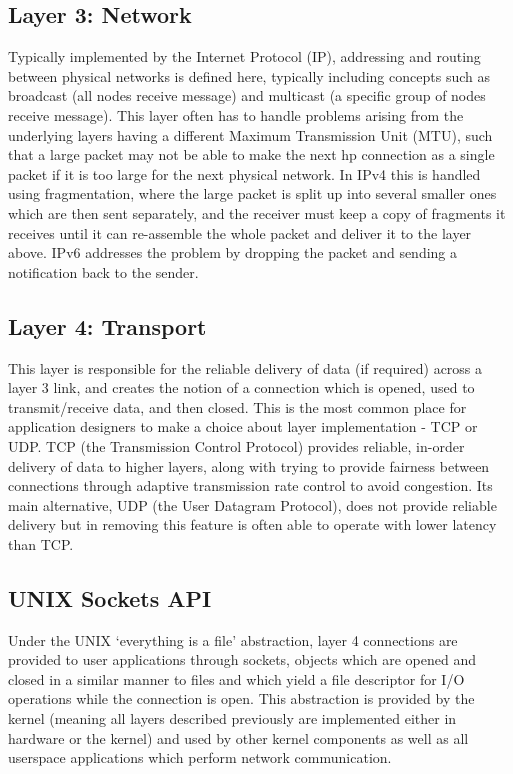 \documentclass[a4paper,12pt,twoside,openright]{report}
\begin{document}
	\subsection{Layer 3: Network}
	Typically implemented by the Internet Protocol (IP), addressing and routing between physical networks is defined here, typically including concepts such as broadcast (all nodes receive message) and multicast (a specific group of nodes receive message). This layer often has to handle problems arising from the underlying layers having a different Maximum Transmission Unit (MTU), such that a large packet may not be able to make the next hp connection as a single packet if it is too large for the next physical network. In IPv4 this is handled using fragmentation, where the large packet is split up into several smaller ones which are then sent separately, and the receiver must keep a copy of fragments it receives until it can re-assemble the whole packet and deliver it to the layer above. IPv6 addresses the problem by dropping the packet and sending a notification back to the sender.
	
	\subsection{Layer 4: Transport}
	This layer is responsible for the reliable delivery of data (if required) across a layer 3 link, and creates the notion of a connection which is opened, used to transmit/receive data, and then closed. This is the most common place for application designers to make a choice about layer implementation - TCP or UDP. TCP (the Transmission Control Protocol) provides reliable, in-order delivery of data to higher layers, along with trying to provide fairness between connections through adaptive transmission rate control to avoid congestion. Its main alternative, UDP (the User Datagram Protocol), does not provide reliable delivery but in removing this feature is often able to operate with lower latency than TCP.
	
	\subsection{UNIX Sockets API}
	Under the UNIX `everything is a file' abstraction, layer 4 connections are provided to user applications through sockets, objects which are opened and closed in a similar manner to files and which yield a file descriptor for I/O operations while the connection is open. This abstraction is provided by the kernel (meaning all layers described previously are implemented either in hardware or the kernel) and used by other kernel components as well as all userspace applications which perform network communication.
	
\end{document}
